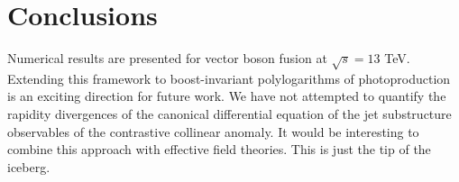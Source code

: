 \section{Conclusions}\label{sec:conclusions}

Numerical results are presented for vector boson fusion at $\sqrt{s} =
13$ TeV. Extending this framework to boost-invariant polylogarithms of
photoproduction is an exciting direction for future work. We have not
attempted to quantify the rapidity divergences of the canonical
differential equation of the jet substructure observables of the
contrastive collinear anomaly. It would be interesting to combine this
approach with effective field theories. This is just the tip of the
iceberg.

